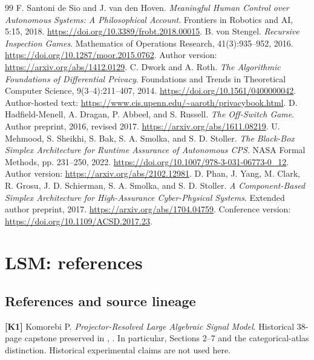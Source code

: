 \documentclass[11pt,oneside,openany]{book}
\numberwithin{equation}{section}
\begin{document}
\begin{thebibliography}{99}
 F. Santoni de Sio and J. van den Hoven. \emph{Meaningful Human Control over Autonomous Systems: A Philosophical Account}. Frontiers in Robotics and AI, 5:15, 2018. \url{https://doi.org/10.3389/frobt.2018.00015}.
 B. von Stengel. \emph{Recursive Inspection Games}. Mathematics of Operations Research, 41(3):935--952, 2016. \url{https://doi.org/10.1287/moor.2015.0762}. Author version: \url{https://arxiv.org/abs/1412.0129}.
 C. Dwork and A. Roth. \emph{The Algorithmic Foundations of Differential Privacy}. Foundations and Trends in Theoretical Computer Science, 9(3--4):211--407, 2014. \url{https://doi.org/10.1561/0400000042}. Author-hosted text: \url{https://www.cis.upenn.edu/~aaroth/privacybook.html}.
 D. Hadfield-Menell, A. Dragan, P. Abbeel, and S. Russell. \emph{The Off-Switch Game}. Author preprint, 2016, revised 2017. \url{https://arxiv.org/abs/1611.08219}.
 U. Mehmood, S. Sheikhi, S. Bak, S. A. Smolka, and S. D. Stoller. \emph{The Black-Box Simplex Architecture for Runtime Assurance of Autonomous CPS}. NASA Formal Methods, pp. 231--250, 2022. \url{https://doi.org/10.1007/978-3-031-06773-0_12}. Author version: \url{https://arxiv.org/abs/2102.12981}.
 D. Phan, J. Yang, M. Clark, R. Grosu, J. D. Schierman, S. A. Smolka, and S. D. Stoller. \emph{A Component-Based Simplex Architecture for High-Assurance Cyber-Physical Systems}. Extended author preprint, 2017. \url{https://arxiv.org/abs/1704.04759}. Conference version: \url{https://doi.org/10.1109/ACSD.2017.23}.

\end{thebibliography}

\chapter{LSM: references}
\section{References and source
lineage}\label{LSM:references-and-source-lineage}

\textbf{{[}K1{]}} Komorebi P. \emph{Projector-Resolved Large Algebraic
Signal Model}. Historical 38-page capstone preserved in
,
.
In particular, Sections 2--7 and the categorical-atlas distinction.
Historical experimental claims are not used here.
\end{document}
